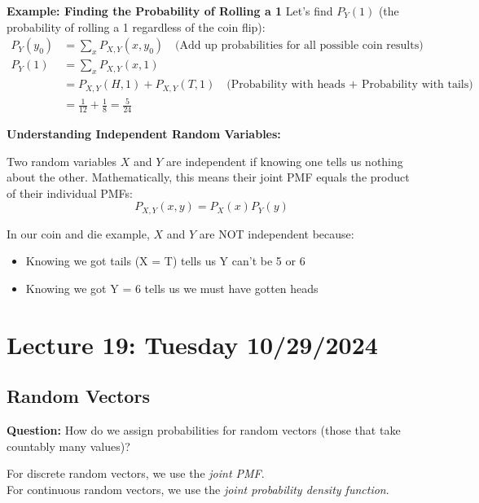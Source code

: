 \documentclass{article}
\begin{document}
    \vspace{0.3cm}
    \noindent
    \textbf{Example: Finding the Probability of Rolling a 1}
    Let's find $P_Y(1)$ (the probability of rolling a 1 regardless of the coin flip):
    \begin{align*}
        P_Y(y_0) &= \sum_{x} P_{X,Y}(x,y_0) \quad \text{(Add up probabilities for all possible coin results)} \\[0.2cm]
        P_Y(1) &= \sum_{x} P_{X,Y}(x,1) \\[0.2cm]
        &= P_{X,Y}(H,1) + P_{X,Y}(T,1) \quad \text{(Probability with heads + Probability with tails)} \\[0.2cm]
        &= \frac{1}{12} + \frac{1}{8} = \frac{5}{24}
    \end{align*}

    \vspace{0.3cm}
    \noindent
    \pagebreak
    \textbf{Understanding Independent Random Variables:}
    
    Two random variables $X$ and $Y$ are independent if knowing one tells us nothing about the other.
    Mathematically, this means their joint PMF equals the product of their individual PMFs:
    \[
        P_{X,Y}(x,y) = P_X(x)P_Y(y)
    \]

    In our coin and die example, $X$ and $Y$ are NOT independent because:
    \begin{itemize}
        \item Knowing we got tails (X = T) tells us Y can't be 5 or 6
        \item Knowing we got Y = 6 tells us we must have gotten heads
    \end{itemize}

    \section*{Lecture 19: Tuesday 10/29/2024}

    \subsection*{Random Vectors}
    
    \noindent
    \textbf{Question:} How do we assign probabilities for random vectors (those that take countably many values)?

    \vspace{0.3cm}
    \noindent
    For discrete random vectors, we use the \textit{joint PMF}. \\
    For continuous random vectors, we use the \textit{joint probability density function}.
\end{document}
